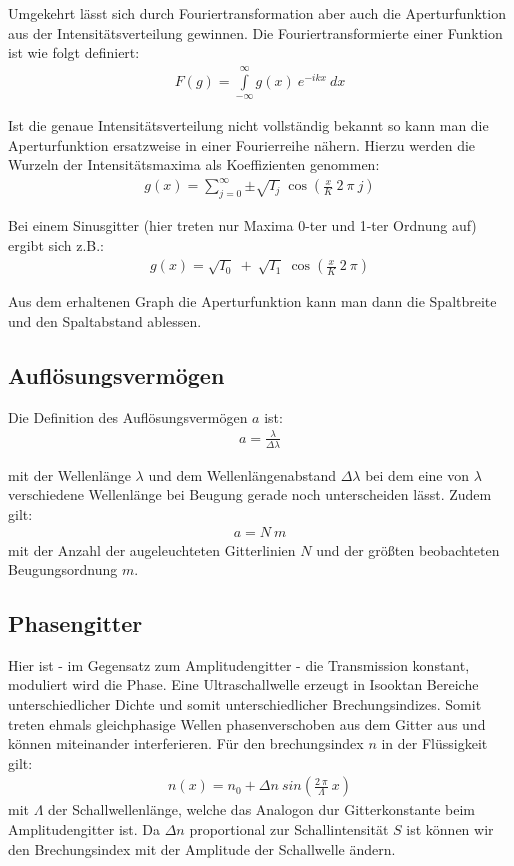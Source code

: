 \documentclass[12pt]{article}
\begin{document}
Umgekehrt lässt sich durch Fouriertransformation aber auch die Aperturfunktion aus der Intensitätsverteilung gewinnen.
Die Fouriertransformierte einer Funktion ist wie folgt definiert:
\begin{align}
 F(g) = \int\limits_{-\infty}^{\infty}g(x)~e^{-ikx}~dx
\end{align}

Ist die genaue Intensitätsverteilung nicht vollständig bekannt so kann man die Aperturfunktion ersatzweise in einer Fourierreihe nähern.
Hierzu werden die Wurzeln der Intensitätsmaxima als Koeffizienten genommen:
\begin{align}
 g(x) = \sum_{j=0}^{\infty}{\pm \sqrt{I_j} \ \cos \left( \frac{x}{K} \ 2 \ \pi \ j \right) }
\end{align}

Bei einem Sinusgitter (hier treten nur Maxima 0-ter und 1-ter Ordnung auf) ergibt sich z.B.:
\begin{align*}
 g(x) = \sqrt{I_0} \ + \ \sqrt{I_1} \ \cos\left( \frac{x}{K} \ 2 \ \pi \right)
\end{align*}

Aus dem erhaltenen Graph die Aperturfunktion kann man dann die Spaltbreite und den Spaltabstand ablessen.

\subsection{Auflösungsvermögen}
Die Definition des Auflösungsvermögen $a$ ist:
\begin{align}
 a = \frac{\lambda}{\Delta\lambda}
\end{align}

mit der Wellenlänge $\lambda$ und dem Wellenlängenabstand $\Delta\lambda$ bei dem eine von $\lambda$ verschiedene Wellenlänge bei Beugung gerade noch
unterscheiden lässt. Zudem gilt:
\begin{align}
 a = N \ m
\end{align}
mit der Anzahl der augeleuchteten Gitterlinien $N$ und der größten beobachteten Beugungsordnung $m$.

\subsection{Phasengitter}
Hier ist - im Gegensatz zum Amplitudengitter - die Transmission konstant, moduliert wird die Phase.
Eine Ultraschallwelle erzeugt in Isooktan Bereiche unterschiedlicher Dichte und somit unterschiedlicher Brechungsindizes.
Somit treten ehmals gleichphasige Wellen phasenverschoben aus dem Gitter aus und können miteinander interferieren. Für den brechungsindex $n$ in der 
Flüssigkeit gilt:
\begin{align}
 n(x) = n_0 + \Delta n \ sin\left(\frac{2\ \pi}{\Lambda}\ x\right)
\end{align}
mit $\Lambda$ der Schallwellenlänge, welche das Analogon dur Gitterkonstante beim Amplitudengitter ist.
Da $\Delta n$ proportional zur Schallintensität $S$ ist können wir den Brechungsindex mit der Amplitude der Schallwelle ändern.
\end{document}

